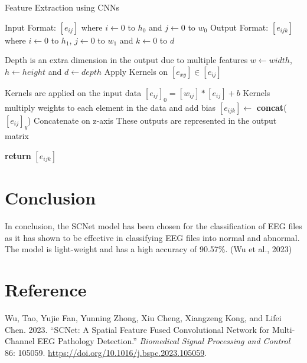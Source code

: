 \documentclass[11pt]{article}
\newlength{\cslhangindent}
\newlength{\cslentryspacingunit} %
\newenvironment{CSLReferences}[2] %
{%
    \setlength{\parindent}{0pt}
    \ifodd #1
        \let\oldpar\par
        \def\par{\hangindent=\cslhangindent\oldpar}
    \fi
    \setlength{\parskip}{#2\cslentryspacingunit}
}%
{}
\begin{document}
\begin{algorithm}
    \caption{Feature Extraction using CNNs}
    \begin{algorithmic}[1]
        \State Input Format: $[e_{ij}]$ where $i \gets 0$ to $h_0$ and $j \gets 0$ to $w_0$
        \State Output Format: $[e_{ijk}]$ where $i \gets 0$ to $h_1$, $j \gets 0$ to $w_1$ and $k \gets 0$ to $d$

        \Comment Depth is an extra dimension in the output due to multiple features
        \State $w \gets width$, $h \gets height$ and $d \gets depth$
        \State Apply Kernels on $[e_{xy}] \in [e_{ij}]$ 

        \State \Comment Kernels are applied on the input data
        \State $[e_{ij}]_0 = [w_{ij}] * [e_{ij}] + b$
        \State \Comment Kernels multiply weights to each element in the data and add bias
        \State $[e_{ijk}] \gets$ \textbf{concat}($[e_{ij}]_y$) \Comment Concatenate on z-axis
        \State \Comment These outputs are represented in the output matrix

        \State \textbf{return} $[e_{ijk}]$


        \EndProcedure

    \end{algorithmic}
\end{algorithm}

\newpage
\section{Conclusion}
In conclusion, the SCNet model has been chosen for the classification of EEG files as it has shown to be effective in classifying EEG files into normal and abnormal. The model is light-weight and has a high accuracy of 90.57\%. (Wu et al., 2023)

\section{Reference}
\hypertarget{refs}{}
\begin{CSLReferences}{1}{0}
    \leavevmode{}%
    Wu, Tao, Yujie Fan, Yunning Zhong, Xiu Cheng, Xiangzeng Kong, and Lifei
    Chen. 2023. {``SCNet: A Spatial Feature Fused Convolutional Network for
    Multi-Channel EEG Pathology Detection.''} \emph{Biomedical Signal
    Processing and Control} 86: 105059.
    \url{https://doi.org/10.1016/j.bspc.2023.105059}.

\end{CSLReferences}
\end{document}
